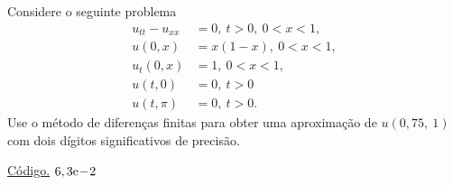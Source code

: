 \begin{exer}
  Considere o seguinte problema
  \begin{align}
    u_{tt} - u_{xx} &= 0,~t>0,~0< x < 1,\\
    u(0,x) &= x(1-x),~0<x<1,\\
    u_t(0,x) &= 1,~0<x<1,\\
    u(t,0) &= 0,~t>0\\
    u(t,\pi) &= 0,~t>0.
  \end{align}
Use o método de diferenças finitas para obter uma aproximação de $u(0,75,~1)$ com dois dígitos significativos de precisão.
\end{exer}
\begin{resp}
  \ifisoctave 
  \href{https://github.com/phkonzen/notas/blob/master/src/MatematicaNumerica/cap_edp/dados/exer_edp_onda_1/exer_edp_onda_1.m}{Código.} 
  \fi
  $6,3\mathrm{e}\!-\!2$
\end{resp}